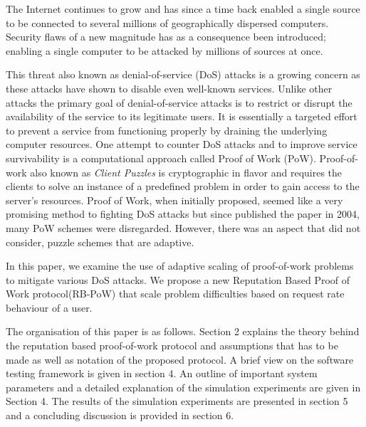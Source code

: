 The Internet continues to grow and has since a time back enabled a single source to be connected to several millions of geographically dispersed computers. Security flaws of a new magnitude has as a consequence been introduced; enabling a single computer to be attacked by millions of sources at once. 

This threat also known as denial-of-service (DoS) attacks is a growing concern as these attacks have shown to disable even well-known services. Unlike other attacks the primary goal of denial-of-service attacks is to restrict or disrupt the availability of the service to its legitimate users. It is essentially a targeted effort to prevent a service from functioning properly by draining the underlying computer resources. 
One attempt to counter DoS attacks and to improve service survivability is a computational approach called Proof of Work (PoW). Proof-of-work also known as \emph{Client Puzzles}\cite{dosauth, JuelsB99} is cryptographic in flavor and requires the clients to solve an instance of a predefined problem in order to gain access to the server’s resources. Proof of Work, when initially proposed, seemed like a very promising method to fighting DoS attacks but since \citeauthor{LaurieC04} published the paper  in 2004, many PoW schemes were disregarded. However, there was an aspect that \citeauthor{LaurieC04} did not consider, puzzle schemes that are adaptive\cite{Green,gunter}.

In this paper, we examine the use of adaptive scaling of proof-of-work problems to mitigate various DoS attacks. We propose a new Reputation Based Proof of Work protocol(RB-PoW) that scale problem difficulties based on request rate behaviour of a user.

The organisation of this paper is as follows. Section 2 explains the theory behind the reputation based proof-of-work protocol and assumptions that has to be made as well as notation of the proposed protocol. A brief view on the software testing framework is given in section 4.
An outline of important system parameters and a detailed explanation of the simulation experiments are given in Section 4. The results of the simulation experiments are presented in section 5 and a concluding discussion is provided in section 6.



